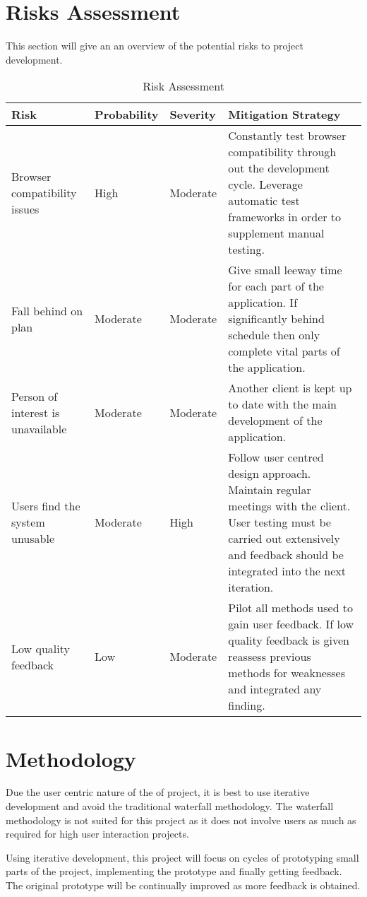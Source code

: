 \documentclass[a4paper,oneside,11pt]{report}
\begin{document}
\chapter{Risks Assessment}
 	This section will give an an overview of the potential risks to project development.
\begin{center}
	\begin{table}[!ht]
    \begin{tabular}[ht]{| l | l | l | p{5cm} |}
    \hline
    Risk & Probability & Severity & Mitigation Strategy \\ 
    \hline
    Browser compatibility issues & High & Moderate & Constantly test browser compatibility through out the development cycle. Leverage automatic test frameworks in order to supplement manual testing.\\ \hline
    Fall behind on plan & Moderate & Moderate & Give small leeway time for each part of the application. If significantly behind schedule then only complete vital parts of the application.  \\ \hline
    Person of interest is unavailable & Moderate & Moderate &  Another client is kept up to date with the main development of the application.\\ 
    \hline
Users find the system unusable & Moderate & High & Follow user centred design approach. Maintain regular meetings with the client. User testing must be carried out extensively and feedback should be integrated into the next iteration. \\ 
    \hline
    Low quality feedback & Low & Moderate & Pilot all methods used to gain user feedback. If low quality feedback is given reassess previous methods for weaknesses and integrated any finding. \\ 
    \hline
    
    \end{tabular}
    \caption{Risk Assessment}
\label{tab:xyz}
    \end{table}
    \end{center}
\chapter{Methodology}
Due the user centric nature of the of project, it is best to use iterative development and avoid the traditional waterfall methodology. The waterfall methodology is not suited for this project as it does not involve users as much as required for high user interaction projects. 

Using iterative development, this project will focus on cycles of prototyping small parts of the project, implementing the prototype and finally getting feedback. The original prototype will be continually improved as more feedback is obtained.
\end{document}
